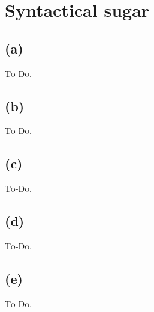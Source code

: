 


\setcounter{section}{1}

\section{Syntactical sugar}

\subsection{(a)}

\textsc{To-Do.}

\subsection{(b)}

\textsc{To-Do.}

\subsection{(c)}

\textsc{To-Do.}

\subsection{(d)}

\textsc{To-Do.}

\subsection{(e)}

\textsc{To-Do.}


